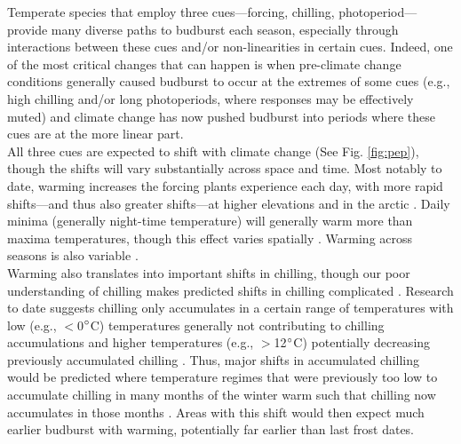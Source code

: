 \documentclass[11pt,letter]{article}
\begin{document}
Temperate species that employ three cues---forcing, chilling, photoperiod---provide many diverse paths to budburst each season, especially through interactions between these cues and/or non-linearities in certain cues. Indeed, one of the most critical changes that can happen is when pre-climate change conditions generally caused budburst to occur at the extremes of some cues (e.g., high chilling and/or long photoperiods, where responses may be effectively muted) and climate change has now pushed budburst into periods where these cues are at the more linear part.\\ 

All three cues are expected to shift with climate change (See Fig. \ref{fig:pep}), though the shifts will vary substantially across space and time. Most notably to date, warming increases the forcing plants experience each day, with more rapid shifts---and thus also greater shifts---at higher elevations and in the arctic \citep{IPCC:2014sm}. Daily minima (generally night-time temperature) will generally warm more than maxima temperatures, though this effect varies spatially \citep{Alexander:2006qy}. Warming across seasons is also variable \citep{Alexander:2006qy}. \\ %

Warming also translates into important shifts in chilling, though our poor understanding of chilling makes predicted shifts in chilling complicated \citep{chuine2016}. Research to date suggests chilling only accumulates in a certain range of temperatures with low (e.g., $<$0$\degree$C) temperatures generally not contributing to chilling accumulations and higher temperatures (e.g., $>$12$\degree$C) potentially decreasing previously accumulated chilling \citep{richardson1974,fishman1987}. Thus, major shifts in accumulated chilling would be predicted where temperature regimes that were previously too low to accumulate chilling in many months of the winter warm such that chilling now accumulates in those months \citep{guy2014}. Areas with this shift would then expect much earlier budburst with warming, potentially far earlier than last frost dates. 
\end{document}
